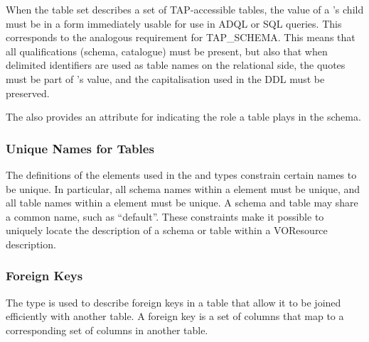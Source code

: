 \documentclass[11pt,a4paper]{ivoa}
\newcommand{\tapschema}{TAP\_SCHE\-MA}
\newcommand{\tapschema}{\mbox{%
  TAP\discretionary{-}{}{\kern-2pt\_}SCHEMA}}
\begin{document}
When the table set describes a set of TAP-accessible tables, the value of
a 's  child must be in a form immediately
usable for use in ADQL or SQL queries. This corresponds to the analogous
requirement for \tapschema.  This means that all qualifications (schema,
catalogue) must be present, but also that when delimited
identifiers are used as table names on the relational side,
the quotes must be part of 's value, and the
capitalisation used in the DDL must be preserved.


The  also provides an attribute for indicating
the role a table plays in the schema.





\subsubsection{Unique Names for Tables}
\label{sect:unique}


The definitions of the  elements used in
the  and
 types
constrain certain names to be unique.  In particular, all schema names
within a  element must be unique, and all
table names within a  element must be
unique.  A schema and table may share a common name, such as
``default''.  These constraints make it possible to uniquely locate
the description of a schema or table within a VOResource description.


\subsubsection{Foreign Keys}
\label{sect:fkey}


The  type is used to describe foreign
keys in a table that allow it to be joined efficiently with another
table.  A foreign key is a set of columns that map to a corresponding
set of columns in another table.
\end{document}
